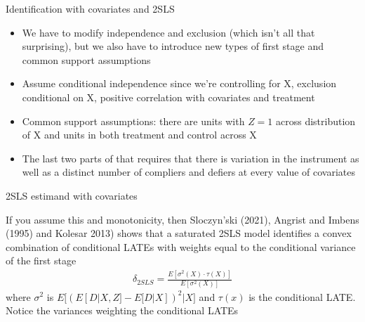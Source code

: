 \documentclass{beamer}
\begin{document}
\begin{frame}{Identification with covariates and 2SLS}

\begin{itemize}
\item We have to modify independence and exclusion (which isn't all that surprising), but we also have to introduce new types of first stage and common support assumptions
\item Assume conditional independence since we're controlling for X, exclusion conditional on X, positive correlation with covariates and treatment
\item Common support assumptions: there are units with $Z=1$ across distribution of X and units in both treatment and control across X 
\item The last two parts of that requires that there is variation in the instrument as well as a distinct number of compliers and defiers at every value of covariates
\end{itemize}

\end{frame}

\begin{frame}{2SLS estimand with covariates}

If you assume this and monotonicity, then Sloczyn'ski (2021),  Angrist and Imbens (1995) and Kolesar 2013) shows that a saturated 2SLS model identifies a convex combination of conditional LATEs with weights equal to the conditional variance of the first stage
\begin{eqnarray*}
\delta_{2SLS} = \frac{E[\sigma^2(X) \cdot \tau(X) ]}{E[\sigma^2(X)]}
\end{eqnarray*}where $\sigma^2$ is $E \bigg [ (E[D|X,Z] - E[D|X] )^2 | X \bigg ]$ and $\tau(x)$ is the conditional LATE.  Notice the variances weighting the conditional LATEs

\end{frame}
\end{document}
